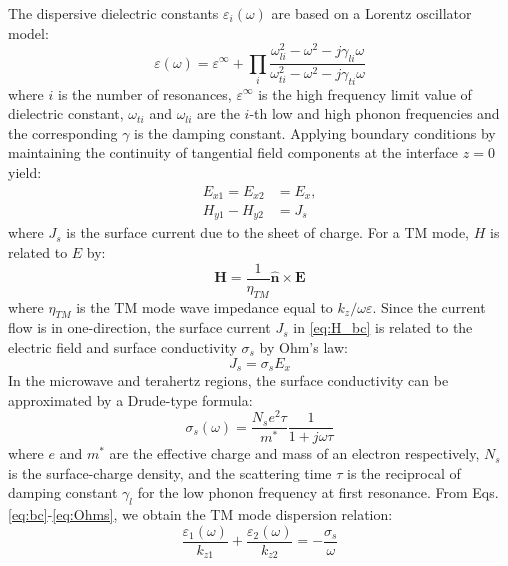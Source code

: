 \documentclass[conference, 10pt]{IEEEtran}
\renewcommand{\v}[1]{\mathbf{#1}} %
\renewcommand{\O}{\omega}  %
\newcommand{\E}{\varepsilon}  %
\renewcommand{\inf}{\infty}  %
\renewcommand{\^}{\hat}  %
\begin{document}
%
The dispersive dielectric constants $\E_i(\O)$ are based on a Lorentz oscillator model:
%
\begin{equation}
  \E(\O) = \E^{\inf} + \prod_i\frac{\O_{li}^2 - \O^2 - j\gamma_{li} \O}{\O_{ti}^2 - \O^2 - j\gamma_{ti} \O}
  \label{eq:eps}
\end{equation}
%
where $i$ is the number of resonances, $\E^{\inf}$ is the high frequency limit value of dielectric constant, $\O_{ti}$ and $\O_{li}$ are the $i$-th low and high phonon frequencies and the corresponding $\gamma$ is the damping constant. Applying boundary conditions by maintaining the continuity of tangential field components at the interface $z = 0$ yield:
%
\begin{subequations}
  \begin{align}
    E_{x1} =  E_{x2} &= E_x,
    \label{eq:E_bc}\\
    H_{y1} - H_{y2} &= J_s
    \label{eq:H_bc}
  \end{align}
  \label{eq:bc}
\end{subequations}
%
where $J_s$ is the surface current due to the sheet of charge. For a TM mode, $H$ is related to $E$ by:
%
\begin{equation}
  \v H = \frac{1}{\eta_{TM}} \v{\^{n}} \times \v E
  \label{eq:H_TM}
\end{equation}
%
where $\eta_{TM}$ is the TM mode wave impedance equal to $k_{z}/{\O \E}$. Since the current flow is in one-direction, the surface current $J_s$ in \eqref{eq:H_bc} is related to the electric field and surface conductivity $\sigma_s$ by Ohm's law:
%
\begin{equation}
  J_s = \sigma_s E_x
  \label{eq:Ohms}
\end{equation}
%
In the microwave and terahertz regions, the surface conductivity can be approximated by a Drude-type formula:
%
\begin{equation}
  \sigma_s(\O) = \frac{N_s e^2 \tau}{m^{\ast}}\frac{1}{1 + j \O \tau}
  \label{eq:conductivity}
\end{equation}
%
where $e$ and $m^*$ are the effective charge and mass of an electron respectively, $N_s$ is the surface-charge density, and the scattering time $\tau$ is the reciprocal of damping constant $\gamma_l$ for the low phonon frequency at first resonance. From Eqs. \eqref{eq:bc}-\eqref{eq:Ohms}, we obtain the TM mode dispersion relation:
%
\begin{equation}
  \frac{\E_1(\O)}{k_{z1}} + \frac{\E_2(\O)}{k_{z2}} = -\frac{\sigma_s}{\O}
  \label{eq:disp_bas_two}
\end{equation}
\end{document}
